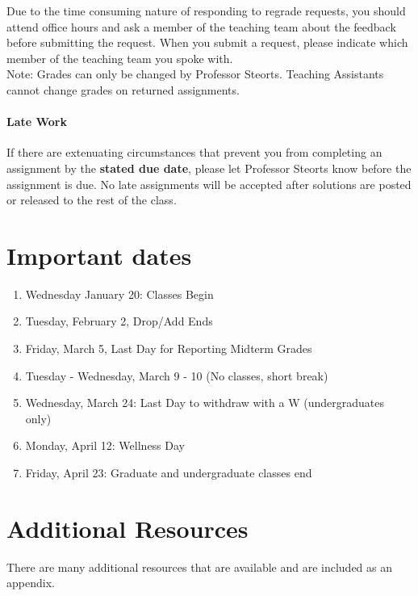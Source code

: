 \documentclass[11pt]{article}
\begin{document}
Due to the time consuming nature of responding to regrade requests, you should attend office hours and ask a member of the teaching team about the feedback before submitting the request. When you submit a request, please indicate which member of the teaching team you spoke with. \\

Note: Grades can only be changed by Professor Steorts. Teaching Assistants cannot change grades on returned assignments.\\


\paragraph{Late Work}

If there are extenuating circumstances that prevent you from completing an assignment by the \textbf{stated due date}, please let Professor Steorts know before the assignment is due. No late assignments will be accepted after solutions are posted or released to the rest of the class.

\section{Important dates}
\begin{enumerate}
\item Wednesday January 20: Classes Begin
\item Tuesday, February 2, Drop/Add Ends
\item Friday, March 5, Last Day for Reporting Midterm Grades
\item Tuesday - Wednesday, March 9 - 10 (No classes, short break)
\item Wednesday, March 24: Last Day to withdraw with a W (undergraduates only)
\item Monday, April 12: Wellness Day
\item Friday, April 23: Graduate and undergraduate classes end
\end{enumerate}



\clearpage
\newpage
\appendix

\section{Additional Resources}
There are many additional resources that are available and are included as an appendix. \\
\end{document}

